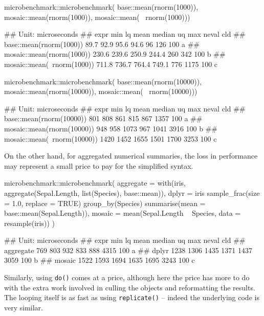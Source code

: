 \begin{Schunk}
\begin{Sinput}
microbenchmark::microbenchmark( 
  base::mean(rnorm(1000)), 
  mosaic::mean(rnorm(1000)), 
  mosaic::mean(~ rnorm(1000)))
\end{Sinput}
\begin{Soutput}
## Unit: microseconds
##                        expr   min    lq  mean median  uq  max neval cld
##     base::mean(rnorm(1000))  89.7  92.9  95.6   94.6  96  126   100 a  
##   mosaic::mean(rnorm(1000)) 230.6 239.6 250.9  244.4 260  342   100  b 
##  mosaic::mean(~rnorm(1000)) 711.8 736.7 764.4  749.1 776 1175   100   c
\end{Soutput}
\begin{Sinput}
microbenchmark::microbenchmark( 
  base::mean(rnorm(10000)), 
  mosaic::mean(rnorm(10000)), 
  mosaic::mean(~ rnorm(10000)))
\end{Sinput}
\begin{Soutput}
## Unit: microseconds
##                         expr  min   lq mean median   uq  max neval cld
##     base::mean(rnorm(10000))  801  808  861    815  867 1357   100 a  
##   mosaic::mean(rnorm(10000))  948  958 1073    967 1041 3916   100  b 
##  mosaic::mean(~rnorm(10000)) 1420 1452 1655   1501 1700 3253   100   c
\end{Soutput}
\end{Schunk}

On the other hand, for aggregated numerical summaries, the loss in
performance may represent a small price to pay for the simplified
syntax.

\begin{Schunk}
\begin{Sinput}
microbenchmark::microbenchmark( 
  aggregate = with(iris, aggregate(Sepal.Length, list(Species), base::mean)),
  dplyr = iris %
    sample_frac(size = 1.0, replace = TRUE) %
    group_by(Species) %
    summarise(mean = base::mean(Sepal.Length)),
  mosaic = mean(Sepal.Length ~ Species, data = resample(iris))
)
\end{Sinput}
\begin{Soutput}
## Unit: microseconds
##       expr  min   lq mean median   uq  max neval cld
##  aggregate  769  803  932    833  888 4315   100 a  
##      dplyr 1238 1306 1435   1371 1437 3059   100  b 
##     mosaic 1522 1593 1694   1635 1695 3243   100   c
\end{Soutput}
\end{Schunk}

Similarly, using \texttt{do()} comes at a price, although here the price
has more to do with the extra work involved in culling the objects and
reformatting the results. The looping itself is as fast as using
\texttt{replicate()} -- indeed the underlying code is very similar.

